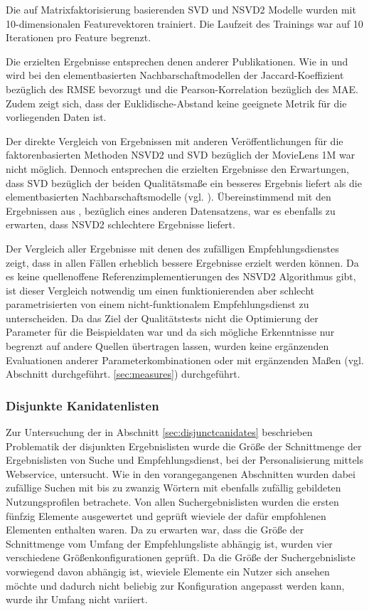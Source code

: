 Die auf Matrixfaktorisierung basierenden SVD und NSVD2 Modelle wurden mit 10-dimensionalen Featurevektoren trainiert. Die Laufzeit des Trainings war auf 10 Iterationen pro Feature begrenzt.

Die erzielten Ergebnisse entsprechen denen anderer Publikationen. Wie in \citep{Herlocker:1999:AFP:312624.312682} und \citep{Candillier:2008} wird bei den elementbasierten Nachbarschaftmodellen der Jaccard-Koeffizient bezüglich des \acs{RMSE} bevorzugt und die Pearson-Korrelation bezüglich des \acs{MAE}. Zudem zeigt sich, dass der Euklidische-Abstand keine geeignete Metrik für die vorliegenden Daten ist.

Der direkte Vergleich von Ergebnissen mit anderen Veröffentlichungen für die faktorenbasierten Methoden NSVD2 und SVD bezüglich der MovieLens 1M war nicht möglich. Dennoch entsprechen die erzielten Ergebnisse den Erwartungen, dass SVD bezüglich der beiden Qualitätsmaße ein besseres Ergebnis liefert als die elementbasierten Nachbarschaftsmodelle (vgl. \citep{Koren:2009:MFT:1608565.1608614}). Übereinstimmend mit den Ergebnissen aus \citep{Paterek07}, bezüglich eines anderen Datensatzens, war es ebenfalls zu erwarten, dass NSVD2 schlechtere Ergebnisse liefert.

Der Vergleich aller Ergebnisse mit denen des zufälligen Empfehlungsdienstes zeigt, dass in allen Fällen erheblich bessere Ergebnisse erzielt werden können. Da es keine quellenoffene Referenzimplementierungen des NSVD2 Algorithmus gibt, ist dieser Vergleich notwendig um einen funktionierenden aber schlecht parametrisierten von einem nicht-funktionalem Empfehlungsdienst zu unterscheiden. Da das Ziel der Qualitätstests nicht die Optimierung der Parameter für die Beispieldaten war und da sich mögliche Erkenntnisse nur begrenzt auf andere Quellen übertragen lassen, wurden keine ergänzenden Evaluationen anderer Parameterkombinationen oder mit ergänzenden Maßen (vgl. Abschnitt  durchgeführt. \ref{sec:measures}) durchgeführt.

\subsubsection{Disjunkte Kanidatenlisten} \label{sec:disjunction_check}

Zur Untersuchung der in Abschnitt \ref{sec:disjunctcanidates} beschrieben Problematik der disjunkten Ergebnislisten wurde die Größe der Schnittmenge der Ergebnislisten von Suche und Empfehlungsdienst, bei der Personalisierung mittels Webservice, untersucht. Wie in den vorangegangenen Abschnitten wurden dabei zufällige Suchen mit bis zu zwanzig Wörtern mit ebenfalls zufällig gebildeten Nutzungsprofilen betrachete. Von allen Suchergebnislisten wurden die ersten fünfzig Elemente ausgewertet und geprüft wieviele der dafür empfohlenen Elementen enthalten waren. Da zu erwarten war, dass die Größe der Schnittmenge vom Umfang der Empfehlungsliste abhängig ist, wurden vier verschiedene Größenkonfigurationen geprüft. Da die Größe der Suchergebnisliste vorwiegend davon abhängig ist, wieviele Elemente ein Nutzer sich ansehen möchte und dadurch nicht beliebig zur Konfiguration angepasst werden kann, wurde ihr Umfang nicht variiert.

